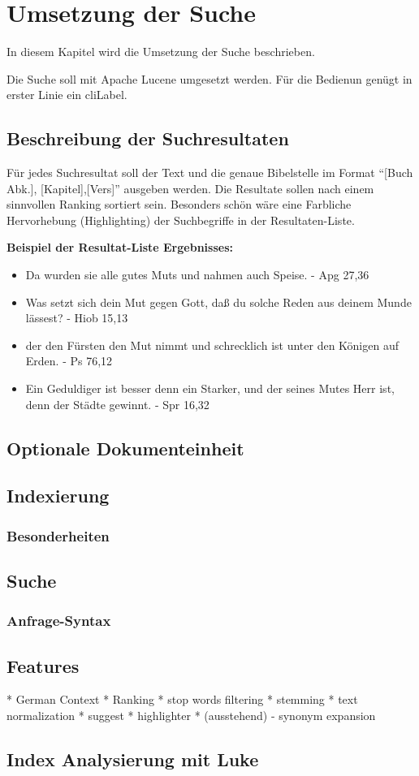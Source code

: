 \chapter{Umsetzung der Suche}
In diesem Kapitel wird die Umsetzung der Suche beschrieben.

Die Suche soll mit Apache Lucene umgesetzt werden. Für die Bedienun genügt in erster Linie ein \gls{cliLabel}.

\section{Beschreibung der Suchresultaten}
Für jedes Suchresultat soll der Text und die genaue Bibelstelle im Format "`[Buch Abk.], [Kapitel],[Vers]"' ausgeben werden.
Die Resultate sollen nach einem sinnvollen Ranking sortiert sein.
Besonders schön wäre eine Farbliche Hervorhebung (Highlighting) der Suchbegriffe in der Resultaten-Liste.

\textbf{Beispiel der Resultat-Liste Ergebnisses:}
\begin{itemize}
	\item Da wurden sie alle gutes Muts und nahmen auch Speise. - Apg 27,36
	\item Was setzt sich dein Mut gegen Gott, daß du solche Reden aus deinem Munde lässest? - Hiob 15,13
	\item der den Fürsten den Mut nimmt und schrecklich ist unter den Königen auf Erden. - Ps 76,12
	\item Ein Geduldiger ist besser denn ein Starker, und der seines Mutes Herr ist, denn der Städte gewinnt. - Spr 16,32
\end{itemize}


\section{Optionale Dokumenteinheit}


\section{Indexierung}
\subsection{Besonderheiten}


\section{Suche}
\subsection{Anfrage-Syntax}

\section{Features}

* German Context
* Ranking
* stop words filtering
* stemming
* text normalization
* suggest
* highlighter
* (ausstehend) - synonym expansion

\section{Index Analysierung mit Luke}
